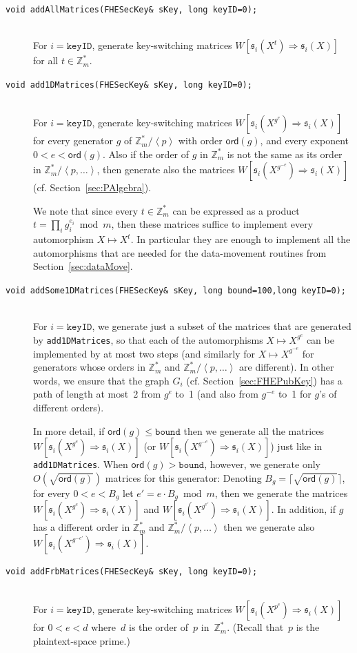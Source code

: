 \documentclass[14pt]{extarticle}
\newcommand{\secref}[1]{Section~\protect\ref{sec:#1}}
\newcommand{\Z}{\mathbb{Z}}
\newcommand{\grp}[1]{\left\langle #1 \right\rangle}
\def\ord{\mathsf{ord}}
\newcommand{\sk}{\mathfrak{s}}
\begin{document}
\begin{description}
\item[\texttt{void addAllMatrices(FHESecKey\& sKey, long keyID=0);}]\ \\
For $i=\mathtt{keyID}$, generate key-switching matrices
$W[\sk_i(X^t)\Rightarrow\sk_i(X)]$ for all $t\in\Z_m^*$.

\item[\texttt{void add1DMatrices(FHESecKey\& sKey, long keyID=0);}]\ \\
For $i=\mathtt{keyID}$, generate key-switching matrices
$W[\sk_i(X^{g^e})\Rightarrow\sk_i(X)]$ for every generator $g$ of
$\Z_m^*/\grp{p}$ with order $\ord(g)$, and every exponent $0< e<
\ord(g)$. Also if the order of $g$ in $\Z_m^*$ is not the same as
its order in $\Z_m^*/\grp{p,\ldots}$, then generate also the matrices
$W[\sk_i(X^{g^{-e}})\Rightarrow\sk_i(X)]$ (cf. \secref{PAlgebra}).

We note that since every $t\in\Z_m^*$ can be expressed as a product
$t=\prod_i g_i^{e_i}\bmod m$, then these matrices suffice to implement
every automorphism $X \mapsto X^t$. In particular they are enough to
implement all the automorphisms that are needed for the data-movement
routines from \secref{dataMove}.

\item[\texttt{void addSome1DMatrices(FHESecKey\& sKey, long bound=100,long keyID=0);}]\ \\
For $i=\mathtt{keyID}$, we generate just a subset of the matrices
that are generated by \texttt{add1DMatrices}, so that each of the
automorphisms $X\mapsto X^{g^e}$ can be implemented by at most two
steps (and similarly for $X\mapsto X^{g^{-e}}$ for generators whose
orders in $\Z_m^*$ and $\Z_m^*/\grp{p,\ldots}$ are different). In other
words, we ensure that the graph $G_i$ (cf. \secref{FHEPubKey}) has
a path of length at most~2 from $g^e$ to~1 (and also from $g^{-e}$
to~1 for $g$'s of different orders).

In more detail, if $\ord(g)\le\mathtt{bound}$ then we generate all
the matrices $W[\sk_i(X^{g^e})\Rightarrow\sk_i(X)]$ (or
$W[\sk_i(X^{g^{-e}})\Rightarrow\sk_i(X)]$) just like in
\texttt{add1DMatrices}. When $\ord(g)>\mathtt{bound}$, however, we
generate only $O(\sqrt{\ord(g)})$ matrices for this generator: Denoting
$B_g= \lceil\sqrt{\ord(g)}\rceil$, for every $0<e<B_g$ let $e'=e\cdot
B_g \bmod m$, then we generate the matrices
$W[\sk_i(X^{g^e})\Rightarrow\sk_i(X)]$ and
$W[\sk_i(X^{g^{e'}})\Rightarrow\sk_i(X)]$. In addition, if $g$ has
a different order in $\Z_m^*$ and $\Z_m^*/\grp{p,\ldots}$ then we
generate also $W\left[\sk_i(X^{g^{-e'}})\Rightarrow\sk_i(X)\right]$.

\item[\texttt{void addFrbMatrices(FHESecKey\& sKey, long keyID=0);}]\ \\
For $i=\mathtt{keyID}$, generate key-switching matrices
$W[\sk_i(X^{p^e})\Rightarrow\sk_i(X)]$ for $0<e<d$ where~$d$ is the
order of~$p$ in~$\Z_m^*$. (Recall that~$p$ is the plaintext-space
prime.)
\end{description}
\end{document}
